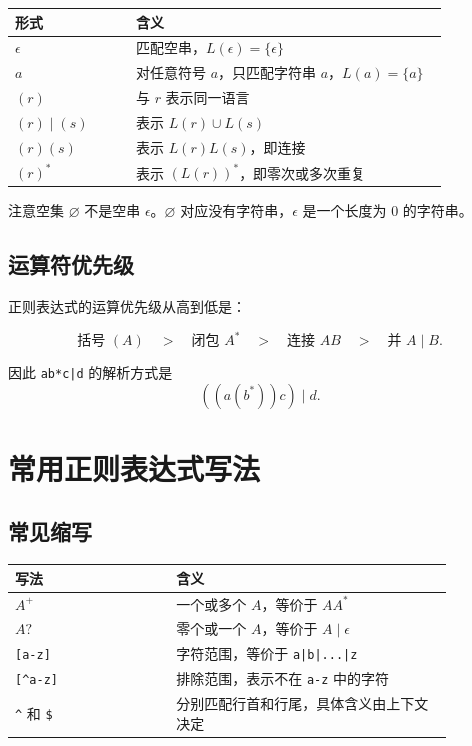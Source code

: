 \documentclass[11pt,a4paper]{article}
\newcommand{\code}[1]{\texttt{#1}}
\begin{document}
\begin{center}
\begin{tabular}{>{\raggedright\arraybackslash}p{0.24\linewidth} >{\raggedright\arraybackslash}p{0.62\linewidth}}
\toprule
\textbf{形式} & \textbf{含义} \\
\midrule
$\epsilon$ & 匹配空串，$L(\epsilon)=\{\epsilon\}$ \\
$a$ & 对任意符号 $a$，只匹配字符串 $a$，$L(a)=\{a\}$ \\
$(r)$ & 与 $r$ 表示同一语言 \\
$(r)\mid(s)$ & 表示 $L(r)\cup L(s)$ \\
$(r)(s)$ & 表示 $L(r)L(s)$，即连接 \\
$(r)^*$ & 表示 $(L(r))^*$，即零次或多次重复 \\
\bottomrule
\end{tabular}
\end{center}

注意空集 $\varnothing$ 不是空串 $\epsilon$。$\varnothing$ 对应没有字符串，$\epsilon$ 是一个长度为 $0$ 的字符串。

\subsection{运算符优先级}

正则表达式的运算优先级从高到低是：

\[
\text{括号 }(A)\quad > \quad \text{闭包 }A^*\quad > \quad \text{连接 }AB\quad > \quad \text{并 }A \mid B.
\]

因此 \code{ab*c|d} 的解析方式是
\[
((a(b^*))c)\mid d.
\]

\section{常用正则表达式写法}

\subsection{常见缩写}

\begin{center}
\begin{tabular}{>{\raggedright\arraybackslash}p{0.32\linewidth} >{\raggedright\arraybackslash}p{0.55\linewidth}}
\toprule
\textbf{写法} & \textbf{含义} \\
\midrule
$A^+$ & 一个或多个 $A$，等价于 $AA^*$ \\
$A?$ & 零个或一个 $A$，等价于 $A \mid \epsilon$ \\
\code{[a-z]} & 字符范围，等价于 \code{a|b|...|z} \\
\texttt{[\textasciicircum{}a-z]} & 排除范围，表示不在 \code{a-z} 中的字符 \\
\texttt{\textasciicircum{}} 和 \texttt{\$} & 分别匹配行首和行尾，具体含义由上下文决定 \\
\bottomrule
\end{tabular}
\end{center}
\end{document}
